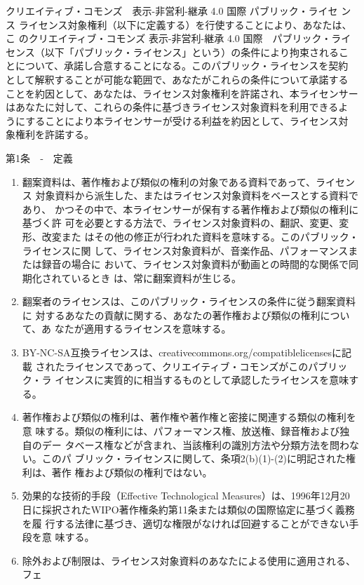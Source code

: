 {クリエイティブ・コモンズ　表示-非営利-継承 4.0 国際 パブリック・ライセ
ンス
ライセンス対象権利（以下に定義する）を行使することにより、あなたは、こ
のクリエイティブ・コモンズ 表示-非営利-継承 4.0 国際　パブリック・ライ
センス（以下「パブリック・ライセンス」という）の条件により拘束されるこ
とについて、承諾し合意することになる。このパブリック・ライセンスを契約
として解釈することが可能な範囲で、あなたがこれらの条件について承諾する
ことを約因として、あなたは、ライセンス対象権利を許諾され、本ライセンサー
はあなたに対して、これらの条件に基づきライセンス対象資料を利用できるよ
うにすることにより本ライセンサーが受ける利益を約因として、ライセンス対
象権利を許諾する。

第1条　‐　定義

\begin{enumerate}
\renewcommand{\labelenumi}{\alph{enumi}.}
\item 翻案資料は、著作権および類似の権利の対象である資料であって、ライセンス
対象資料から派生した、またはライセンス対象資料をベースとする資料であり、
かつその中で、本ライセンサーが保有する著作権および類似の権利に基づく許
可を必要とする方法で、ライセンス対象資料の、翻訳、変更、変形、改変また
はその他の修正が行われた資料を意味する。このパブリック・ライセンスに関
して、ライセンス対象資料が、音楽作品、パフォーマンスまたは録音の場合に
おいて、ライセンス対象資料が動画との時間的な関係で同期化されているとき
は、常に翻案資料が生じる。
\item 翻案者のライセンスは、このパブリック・ライセンスの条件に従う翻案資料に
対するあなたの貢献に関する、あなたの著作権および類似の権利について、あ
なたが適用するライセンスを意味する。
\item BY-NC-SA互換ライセンスは、creativecommons.org/compatiblelicensesに記載
されたライセンスであって、クリエイティブ・コモンズがこのパブリック・ラ
イセンスに実質的に相当するものとして承認したライセンスを意味する。
\item 著作権および類似の権利は、著作権や著作権と密接に関連する類似の権利を意
味する。類似の権利には、パフォーマンス権、放送権、録音権および独自のデー
タベース権などが含まれ、当該権利の識別方法や分類方法を問わない。このパ
ブリック・ライセンスに関して、条項2(b)(1)-(2)に明記された権利は、著作
権および類似の権利ではない。
\item 効果的な技術的手段（Effective Technological Measures）は、1996年12月20
日に採択されたWIPO著作権条約第11条または類似の国際協定に基づく義務を履
行する法律に基づき、適切な権限がなければ回避することができない手段を意
味する。
\item 除外および制限は、ライセンス対象資料のあなたによる使用に適用される、フェ

\end{enumerate}}
